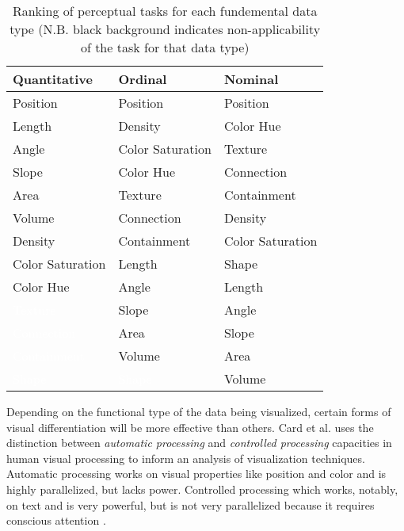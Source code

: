 \begin{table}
    \begin{center}
    \begin{tabular}{ | l | l | l | }
    \hline
    Quantitative & Ordinal & Nominal \\ \hline
    Position & Position & Position \\
    Length & Density & Color Hue \\
    Angle & Color Saturation & Texture \\
    Slope & Color Hue & Connection \\
    Area & Texture & Containment \\
    Volume & Connection & Density \\
    Density & Containment & Color Saturation \\
    Color Saturation & Length & Shape \\
    Color Hue & Angle & Length \\
    \cellcolor{black}\textcolor{white}{Texture} & Slope & Angle \\
    \cellcolor{black}\textcolor{white}{Connection} & Area & Slope \\
    \cellcolor{black}\textcolor{white}{Containment} & Volume & Area \\
    \cellcolor{black}\textcolor{white}{Shape} & \cellcolor{black}\textcolor{white}{Shape} & Volume \\
    \hline
    \end{tabular}
    \end{center}
    \caption{Ranking of perceptual tasks for each fundemental data type (N.B. black background indicates non-applicability of the task for that data type)}
    \label{tab:perceptual}
\end{table}

Depending on the functional type of the data being visualized, certain forms of visual differentiation will be more effective than others. Card et al. \cite{card1997} uses the distinction between \emph{automatic processing} and \emph{controlled processing} capacities in human visual processing to inform an analysis of visualization techniques. Automatic processing works on visual properties like position and color and is highly parallelized, but lacks power. Controlled processing which works, notably, on text and is very powerful, but is not very parallelized because it requires conscious attention \cite{controlauto1977}. 

